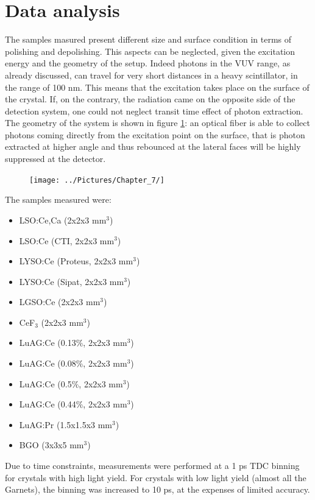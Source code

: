 \section{Data analysis}
The samples masured present different size and surface condition in terms of polishing and depolishing.
This aspects can be neglected, given the excitation energy and the geometry of the setup.
Indeed photons in the VUV range, as already discussed, can travel for very short distances in a heavy scintillator, in the range of 100 nm. This means that the excitation takes place on the surface of the crystal. If, on the contrary, the radiation came on the opposite side of the detection system, one could not neglect transit time effect of photon extraction. The geometry of the system is shown in figure \ref{fig:geom}: an optical fiber is able to collect photons coming directly from the excitation point on the surface, that is photon extracted at higher angle and thus rebounced at the lateral faces will be highly suppressed at the detector.
\begin{figure}[htbp]
\begin{center}
\texttt{[image: ../Pictures/Chapter\_7/]}
\end{center}
\caption[]{}
\label{fig:geom}
\end{figure}
The samples measured were:
\begin{itemize}
\item LSO:Ce,Ca (2x2x3 mm$^{3}$) 
\item LSO:Ce (CTI, 2x2x3 mm$^{3}$)
\item LYSO:Ce (Proteus, 2x2x3 mm$^{3}$)
\item LYSO:Ce (Sipat, 2x2x3 mm$^{3}$)
\item LGSO:Ce (2x2x3 mm$^{3}$)
\item CeF$_{3}$ (2x2x3 mm$^{3}$)
\item LuAG:Ce (0.13$\%$, 2x2x3 mm$^{3}$)
\item LuAG:Ce (0.08$\%$, 2x2x3 mm$^{3}$)
\item LuAG:Ce (0.5$\%$, 2x2x3 mm$^{3}$) 
\item LuAG:Ce (0.44$\%$, 2x2x3 mm$^{3}$)
\item LuAG:Pr (1.5x1.5x3 mm$^{3}$)
\item BGO (3x3x5 mm$^{3}$)
\end{itemize}
Due to time constraints, measurements were performed at a 1 ps TDC binning for crystals with high light yield. For crystals with low light yield (almost all the Garnets), the binning was increased to 10 ps, at the expenses of limited accuracy.
